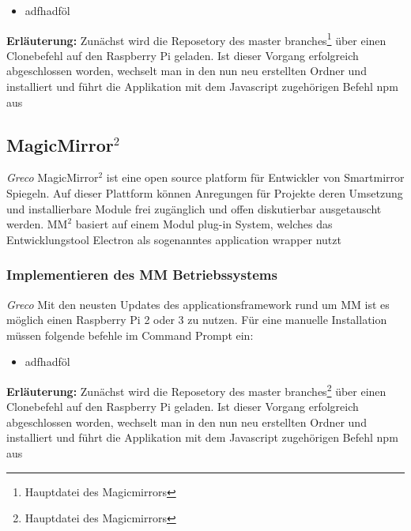 \documentclass[12pt,a4paper]{report}
\begin{document}
\begin{itemize}
	\item adfhadföl
\end{itemize}
\textbf{Erläuterung:}
Zunächst wird die Reposetory des master branches\footnote{Hauptdatei des Magicmirrors} über einen Clonebefehl auf den Raspberry Pi geladen. Ist dieser Vorgang erfolgreich abgeschlossen worden, wechselt man in den nun neu erstellten Ordner und installiert und führt die Applikation mit dem Javascript zugehörigen Befehl npm aus 



\subsection*{MagicMirror$^2$}
\textit{Greco}
MagicMirror$^2$ ist eine open source platform für Entwickler von Smartmirror Spiegeln. Auf dieser Plattform können Anregungen für Projekte deren Umsetzung und installierbare Module frei zugänglich und offen diskutierbar ausgetauscht werden. $\text{MM}^{2}$ basiert auf einem Modul plug-in System, welches das Entwicklungstool Electron als sogenanntes application wrapper nutzt 
\subsubsection{Implementieren des MM Betriebssystems}
\textit{Greco}
Mit den neusten Updates des applicationsframework rund um MM ist es möglich einen Raspberry Pi 2 oder 3 zu nutzen. Für eine manuelle Installation müssen folgende befehle im Command Prompt ein:
 
 \begin{itemize}
 \item adfhadföl
 \end{itemize}
\textbf{Erläuterung:}
Zunächst wird die Reposetory des master branches\footnote{Hauptdatei des Magicmirrors} über einen Clonebefehl auf den Raspberry Pi geladen. Ist dieser Vorgang erfolgreich abgeschlossen worden, wechselt man in den nun neu erstellten Ordner und installiert und führt die Applikation mit dem Javascript zugehörigen Befehl npm aus 
\end{document}
